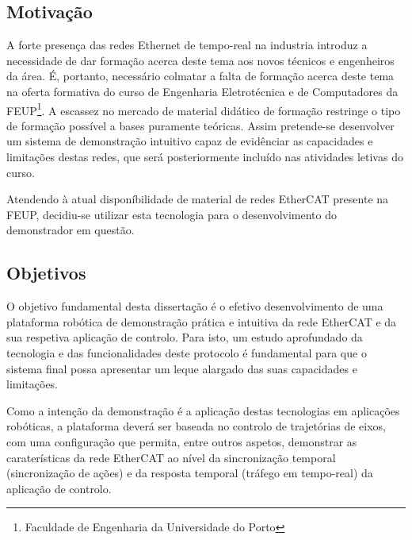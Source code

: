 % 

\subsection{Motivação}\label{sec:motivacao}

A forte presença das redes Ethernet de tempo-real na industria introduz a necessidade de dar formação acerca deste tema aos novos técnicos e engenheiros da área.
É, portanto, necessário colmatar a falta de formação acerca deste tema na oferta formativa do curso de Engenharia Eletrotécnica e de Computadores da FEUP\footnote{Faculdade de Engenharia da Universidade do Porto}.
A escassez no mercado de material didático de formação restringe o tipo de formação possível a bases puramente teóricas.
Assim pretende-se desenvolver um sistema de demonstração intuitivo capaz de evidênciar as capacidades e limitações destas redes, que será posteriormente incluído nas atividades letivas do curso.

Atendendo à atual disponíbilidade de material de redes EtherCAT presente na FEUP, decidiu-se utilizar esta tecnologia para o desenvolvimento do demonstrador em questão. 

% 
% 


\subsection{Objetivos}\label{sec:objetivos}

O objetivo fundamental desta dissertação é o efetivo desenvolvimento de uma plataforma robótica de demonstração prática e intuitiva da rede EtherCAT e da sua
respetiva aplicação de controlo.
Para isto, um estudo aprofundado da tecnologia e das funcionalidades deste protocolo é fundamental para que o sistema final possa apresentar um leque alargado
das suas capacidades e limitações.

Como a intenção da demonstração é a aplicação destas tecnologias em aplicações robóticas, a plataforma deverá ser baseada no controlo de trajetórias de eixos, com uma
configuração que permita, entre outros aspetos, demonstrar as caraterísticas da rede EtherCAT ao nível da sincronização temporal (sincronização de ações) e da resposta
temporal (tráfego em tempo-real) da aplicação de controlo.

